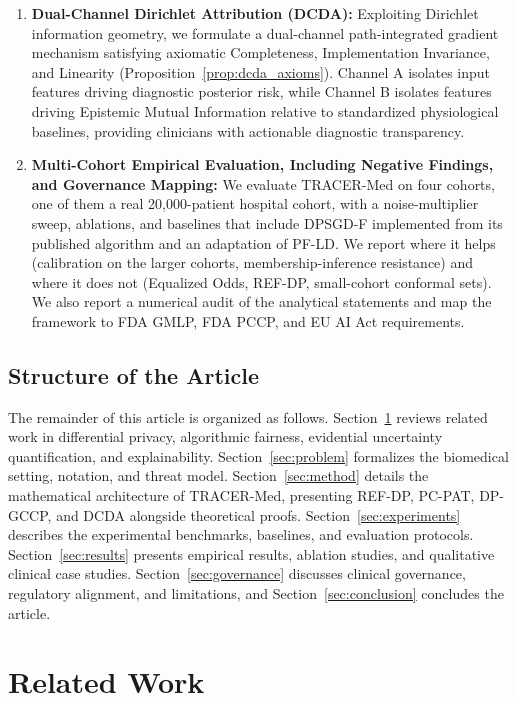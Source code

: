 \documentclass[3p,12pt]{elsarticle}
\theoremstyle{plain}
\theoremstyle{definition}
\begin{document}
\begin{enumerate}
    \item \textbf{Dual-Channel Dirichlet Attribution (DCDA):} Exploiting Dirichlet information geometry, we formulate a dual-channel path-integrated gradient mechanism satisfying axiomatic Completeness, Implementation Invariance, and Linearity (Proposition~\ref{prop:dcda_axioms}). Channel A isolates input features driving diagnostic posterior risk, while Channel B isolates features driving Epistemic Mutual Information relative to standardized physiological baselines, providing clinicians with actionable diagnostic transparency.
    \item \textbf{Multi-Cohort Empirical Evaluation, Including Negative Findings, and Governance Mapping:} We evaluate TRACER-Med on four cohorts, one of them a real 20,000-patient hospital cohort, with a noise-multiplier sweep, ablations, and baselines that include DPSGD-F implemented from its published algorithm and an adaptation of PF-LD. We report where it helps (calibration on the larger cohorts, membership-inference resistance) and where it does not (Equalized Odds, REF-DP, small-cohort conformal sets). We also report a numerical audit of the analytical statements and map the framework to FDA GMLP, FDA PCCP, and EU AI Act requirements.
\end{enumerate}

\subsection{Structure of the Article}
The remainder of this article is organized as follows. Section~\ref{sec:related} reviews related work in differential privacy, algorithmic fairness, evidential uncertainty quantification, and explainability. Section~\ref{sec:problem} formalizes the biomedical setting, notation, and threat model. Section~\ref{sec:method} details the mathematical architecture of TRACER-Med, presenting REF-DP, PC-PAT, DP-GCCP, and DCDA alongside theoretical proofs. Section~\ref{sec:experiments} describes the experimental benchmarks, baselines, and evaluation protocols. Section~\ref{sec:results} presents empirical results, ablation studies, and qualitative clinical case studies. Section~\ref{sec:governance} discusses clinical governance, regulatory alignment, and limitations, and Section~\ref{sec:conclusion} concludes the article.

\section{Related Work}
\label{sec:related}
\end{document}
